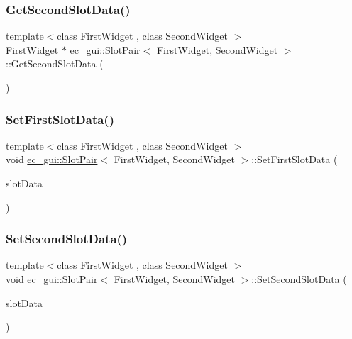 \subsubsection{\texorpdfstring{Get\+Second\+Slot\+Data()}{GetSecondSlotData()}\hspace{0.1cm}{\footnotesize\ttfamily [2/2]}}
{\footnotesize\ttfamily template$<$class First\+Widget , class Second\+Widget $>$ \\
First\+Widget $\ast$ \mbox{\hyperlink{classec__gui_1_1_slot_pair}{ec\+\_\+gui\+::\+Slot\+Pair}}$<$ First\+Widget, Second\+Widget $>$\+::Get\+Second\+Slot\+Data (\begin{DoxyParamCaption}{ }\end{DoxyParamCaption})}

\mbox{\label{classec__gui_1_1_slot_pair_a54aada2b93464cddf14fb48f26d02758}} 
\subsubsection{\texorpdfstring{Set\+First\+Slot\+Data()}{SetFirstSlotData()}}
{\footnotesize\ttfamily template$<$class First\+Widget , class Second\+Widget $>$ \\
void \mbox{\hyperlink{classec__gui_1_1_slot_pair}{ec\+\_\+gui\+::\+Slot\+Pair}}$<$ First\+Widget, Second\+Widget $>$\+::Set\+First\+Slot\+Data (\begin{DoxyParamCaption}\item[{First\+Widget $\ast$}]{slot\+Data }\end{DoxyParamCaption})}

\mbox{\label{classec__gui_1_1_slot_pair_a1114951b564814e1794ed938f46c463c}} 
\subsubsection{\texorpdfstring{Set\+Second\+Slot\+Data()}{SetSecondSlotData()}}
{\footnotesize\ttfamily template$<$class First\+Widget , class Second\+Widget $>$ \\
void \mbox{\hyperlink{classec__gui_1_1_slot_pair}{ec\+\_\+gui\+::\+Slot\+Pair}}$<$ First\+Widget, Second\+Widget $>$\+::Set\+Second\+Slot\+Data (\begin{DoxyParamCaption}\item[{First\+Widget $\ast$}]{slot\+Data }\end{DoxyParamCaption})}



